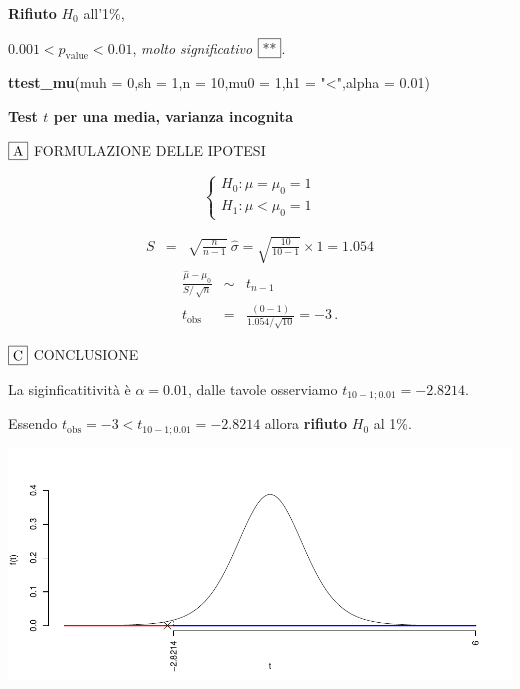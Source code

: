 \documentclass[
  11pt,
]{book}
\newenvironment{Shaded}{\begin{snugshade}}{\end{snugshade}}
\newcommand{\AttributeTok}[1]{\textcolor[rgb]{0.13,0.29,0.53}{#1}}
\newcommand{\DecValTok}[1]{\textcolor[rgb]{0.00,0.00,0.81}{#1}}
\newcommand{\FloatTok}[1]{\textcolor[rgb]{0.00,0.00,0.81}{#1}}
\newcommand{\FunctionTok}[1]{\textcolor[rgb]{0.13,0.29,0.53}{\textbf{#1}}}
\newcommand{\NormalTok}[1]{#1}
\newcommand{\StringTok}[1]{\textcolor[rgb]{0.31,0.60,0.02}{#1}}
\theoremstyle{mytheoremstyle}
\theoremstyle{mydefstyle}
\begin{document}
\textbf{Rifiuto} \(H_0\) all'1\%,

\(0.001<p_\text{value}<0.01\), \emph{molto significativo} \(\fbox{**}\).

\begin{Shaded}
\begin{Highlighting}[]
\FunctionTok{ttest\_mu}\NormalTok{(}\AttributeTok{muh =} \DecValTok{0}\NormalTok{,}\AttributeTok{sh =} \DecValTok{1}\NormalTok{,}\AttributeTok{n =} \DecValTok{10}\NormalTok{,}\AttributeTok{mu0 =} \DecValTok{1}\NormalTok{,}\AttributeTok{h1 =} \StringTok{"\textless{}"}\NormalTok{,}\AttributeTok{alpha =} \FloatTok{0.01}\NormalTok{)}
\end{Highlighting}
\end{Shaded}

\textbf{Test \(t\) per una media, varianza incognita}

\(\fbox{A}\) FORMULAZIONE DELLE IPOTESI

\[\begin{cases}
   H_0: \mu = \mu_0=1 \\
   H_1: \mu < \mu_0=1 
   \end{cases}\]

\begin{eqnarray*}
   S    &=& \sqrt{\frac{n} {n-1}}\ \widehat{\sigma} 
   =  \sqrt{\frac{ 10 } { 10 -1}} \times  1  =  1.054 
   \end{eqnarray*}
\begin{eqnarray*}
   \frac{\hat\mu - \mu_{0}} {S/\,\sqrt{n}}&\sim&t_{n-1}\\
   t_{\text{obs}}
   &=& \frac{ ( 0 -  1 )} { 1.054 /\sqrt{ 10 }}
   =   -3 \, .
   \end{eqnarray*}

\(\fbox{C}\) CONCLUSIONE

La siginficatitività è \(\alpha=0.01\), dalle tavole osserviamo \(t_{10-1;0.01}=-2.8214\).

Essendo \(t_\text{obs}=-3<t_{10-1;0.01}=-2.8214\) allora \textbf{rifiuto} \(H_0\) al 1\%.

\begin{center}\includegraphics{Appunti_di_Statistica_2025_files/figure-latex/25-test-functions-10-4} \end{center}
\end{document}

